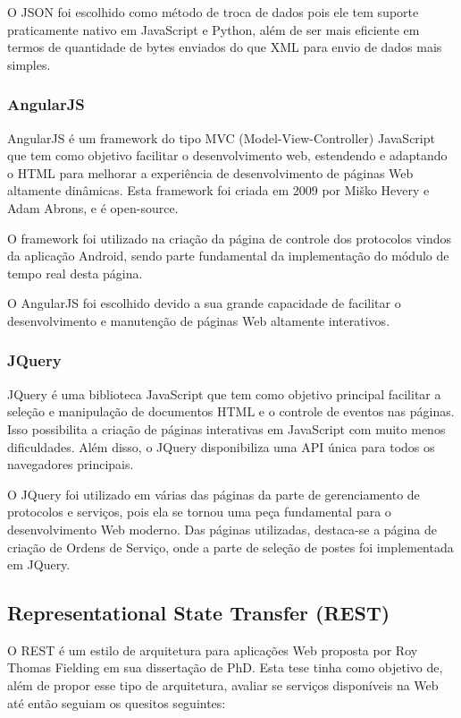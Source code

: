 \documentclass[
	article,			%
	11pt,				%
	oneside,			%
	a4paper,			%
	english,			%
	brazil,				%
	sumario=tradicional
	]{abntex2}
\begin{document}
O JSON foi escolhido como método de troca de dados pois ele tem suporte praticamente nativo em JavaScript e Python, além de ser mais eficiente em termos de quantidade de bytes enviados do que XML para envio de dados mais simples.

\subsubsection{AngularJS}

AngularJS é um framework do tipo MVC (Model-View-Controller) JavaScript que tem como objetivo facilitar o desenvolvimento web, estendendo e adaptando o HTML para melhorar a experiência de desenvolvimento de páginas Web altamente dinâmicas.
Esta framework foi criada em 2009 por Miško Hevery e Adam Abrons, e é open-source. \cite{angularjs}

O framework foi utilizado na criação da página de controle dos protocolos vindos da aplicação Android, sendo parte fundamental da implementação do módulo de tempo real desta página.

O AngularJS foi escolhido devido a sua grande capacidade de facilitar o desenvolvimento e manutenção de páginas Web altamente interativos.

\subsubsection{JQuery}

JQuery é uma biblioteca JavaScript que tem como objetivo principal facilitar a seleção e manipulação de documentos HTML e o controle de eventos nas páginas.
Isso possibilita a criação de páginas interativas em JavaScript com muito menos dificuldades.
Além disso, o JQuery disponibiliza uma API única para todos os navegadores principais. \cite{jquery}

O JQuery foi utilizado em várias das páginas da parte de gerenciamento de protocolos e serviços, pois ela se tornou uma peça fundamental para o desenvolvimento Web moderno.
Das páginas utilizadas, destaca-se a página de criação de Ordens de Serviço, onde a parte de seleção de postes foi implementada em JQuery.

\subsection{Representational State Transfer (REST)}

O REST é um estilo de arquitetura para aplicações Web proposta por Roy Thomas Fielding em sua dissertação de PhD. \cite{fielding}
Esta tese tinha como objetivo de, além de propor esse tipo de arquitetura, avaliar se serviços disponíveis na Web até então seguiam os quesitos seguintes:
\end{document}
